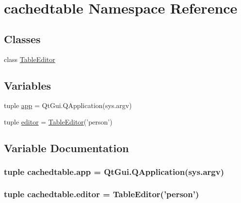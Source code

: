\hypertarget{namespacecachedtable}{}\section{cachedtable Namespace Reference}
\label{namespacecachedtable}
\subsection*{Classes}
\begin{DoxyCompactItemize}
\item 
class \hyperlink{classcachedtable_1_1TableEditor}{Table\+Editor}
\end{DoxyCompactItemize}
\subsection*{Variables}
\begin{DoxyCompactItemize}
\item 
tuple \hyperlink{namespacecachedtable_ae6c47197eb62fcd0a90770128a220ca4}{app} = Qt\+Gui.\+Q\+Application(sys.\+argv)
\item 
tuple \hyperlink{namespacecachedtable_a9aa358a7f787f4f416e3481e6125b214}{editor} = \hyperlink{classcachedtable_1_1TableEditor}{Table\+Editor}('person')
\end{DoxyCompactItemize}


\subsection{Variable Documentation}
\hypertarget{namespacecachedtable_ae6c47197eb62fcd0a90770128a220ca4}{}
\subsubsection[{app}]{\setlength{\rightskip}{0pt plus 5cm}tuple cachedtable.\+app = Qt\+Gui.\+Q\+Application(sys.\+argv)}\label{namespacecachedtable_ae6c47197eb62fcd0a90770128a220ca4}
\hypertarget{namespacecachedtable_a9aa358a7f787f4f416e3481e6125b214}{}
\subsubsection[{editor}]{\setlength{\rightskip}{0pt plus 5cm}tuple cachedtable.\+editor = {\bf Table\+Editor}('person')}\label{namespacecachedtable_a9aa358a7f787f4f416e3481e6125b214}
